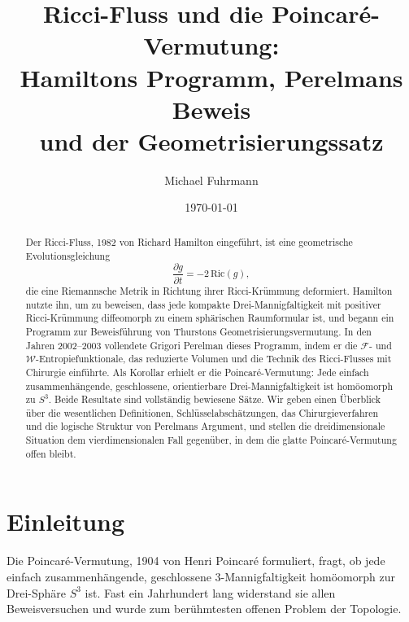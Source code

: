 \documentclass[12pt,a4paper]{amsart}
\theoremstyle{definition}
\theoremstyle{remark}
\newcommand{\Ric}{\mathrm{Ric}}
\begin{document}

\title{Ricci-Fluss und die Poincaré-Vermutung:\\
       Hamiltons Programm, Perelmans Beweis\\
       und der Geometrisierungssatz}

\author{Michael Fuhrmann}
\address{Specialist Mathematics Project, Build 147}
\date{\today}

\begin{abstract}
Der Ricci-Fluss, 1982 von Richard Hamilton eingeführt, ist eine geometrische
Evolutionsgleichung
\[
  \frac{\partial g}{\partial t} = -2\,\Ric(g),
\]
die eine Riemannsche Metrik in Richtung ihrer Ricci-Krümmung deformiert.
Hamilton nutzte ihn, um zu beweisen, dass jede kompakte Drei-Mannigfaltigkeit
mit positiver Ricci-Krümmung diffeomorph zu einem sphärischen Raumformular
ist, und begann ein Programm zur Beweisführung von Thurstons
Geometrisierungsvermutung.  In den Jahren 2002--2003 vollendete Grigori
Perelman dieses Programm, indem er die $\mathcal{F}$- und
$\mathcal{W}$-Entropiefunktionale, das reduzierte Volumen und die Technik
des Ricci-Flusses mit Chirurgie einführte.  Als Korollar erhielt er die
Poincaré-Vermutung: Jede einfach zusammenhängende, geschlossene, orientierbare
Drei-Mannigfaltigkeit ist homöomorph zu $S^3$.  Beide Resultate sind
vollständig bewiesene Sätze.  Wir geben einen Überblick über die
wesentlichen Definitionen, Schlüsselabschätzungen, das Chirurgieverfahren
und die logische Struktur von Perelmans Argument, und stellen die
dreidimensionale Situation dem vierdimensionalen Fall gegenüber, in dem die
glatte Poincaré-Vermutung offen bleibt.
\end{abstract}

\maketitle
\tableofcontents

\section{Einleitung}

Die Poincaré-Vermutung, 1904 von Henri Poincaré formuliert, fragt, ob jede
einfach zusammenhängende, geschlossene $3$-Mannigfaltigkeit homöomorph zur
Drei-Sphäre $S^3$ ist.  Fast ein Jahrhundert lang widerstand sie allen
Beweisversuchen und wurde zum berühmtesten offenen Problem der Topologie.
\end{document}
